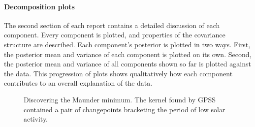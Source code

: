 \documentclass[twoside]{article}
\begin{document}


\paragraph{Decomposition plots}

The second section of each report contains a detailed discussion of each component.
Every component is plotted, and properties of the covariance structure are described.
Each component's posterior is plotted in two ways.  First, the posterior mean and variance of each component is plotted on its own.  Second, the posterior mean and variance of all components shown so far is plotted against the data.  This progression of plots 
shows qualitatively how each component contributes to an overall explanation of the data.


\begin{figure}[ht]
\centering
{}
\caption{Discovering the Maunder minimum.  The kernel found by GPSS contained a pair of changepoints bracketing the period of low solar activity.}
\label{fig:maunder}
\end{figure}
\end{document}
